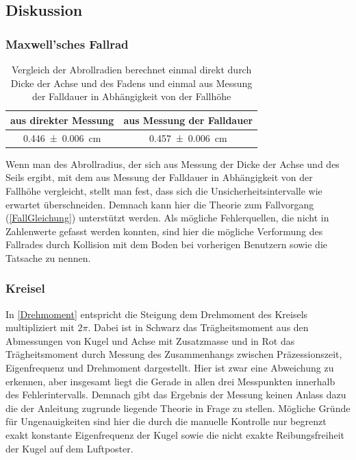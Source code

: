 \documentclass[
	a4paper,
	12pt,
	pagesize,
	ngerman
]{scrartcl}
\begin{document}
	\subsection{Diskussion}
	\subsubsection{Maxwell'sches Fallrad}
	
	\begin{table}[tb]
		\centering
		\begin{tabular}{ c | c }
			aus direkter Messung & aus Messung der Falldauer\\ \hline
			\SI{0,446 \pm 0,006}{cm} & \SI{0,457 \pm 0,006}{cm} \\
		\end{tabular}
		\caption{Vergleich der Abrollradien berechnet einmal direkt durch Dicke der Achse und des Fadens und einmal aus Messung der Falldauer in Abhängigkeit von der Fallhöhe}
		\label{Abrollradius_Vergleich} 
	\end{table}
	Wenn man des Abrollradius, der sich aus Messung der Dicke der Achse und des Seils ergibt, mit dem aus Messung der Falldauer in Abhängigkeit von der Fallhöhe vergleicht, stellt man fest, dass sich die Unsicherheitsintervalle wie erwartet überschneiden.
	Demnach kann hier die Theorie zum Fallvorgang (\cref{FallGleichung}) unterstützt werden.
	Als mögliche Fehlerquellen, die nicht in Zahlenwerte gefasst werden konnten, sind hier die mögliche Verformung des Fallrades durch Kollision mit dem Boden bei vorherigen Benutzern sowie die Tatsache zu nennen.
	
	\subsubsection{Kreisel}
	In \cref{Drehmoment} entspricht die Steigung dem Drehmoment des Kreisels multipliziert mit $2 \pi $.
	Dabei ist in Schwarz das Trägheitsmoment aus den Abmessungen von Kugel und Achse mit Zusatzmasse und in Rot das Trägheitsmoment durch Messung des Zusammenhangs zwischen Präzessionszeit, Eigenfrequenz und Drehmoment dargestellt.
	Hier ist zwar eine Abweichung zu erkennen, aber insgesamt liegt die Gerade in allen drei Messpunkten innerhalb des Fehlerintervalls.
	Demnach gibt das Ergebnis der Messung keinen Anlass dazu die der Anleitung zugrunde liegende Theorie in Frage zu stellen.
	Mögliche Gründe für Ungenauigkeiten sind hier die durch die manuelle Kontrolle nur begrenzt exakt konstante Eigenfrequenz der Kugel sowie die nicht exakte Reibungsfreiheit der Kugel auf dem Luftposter.
	
\end{document}
